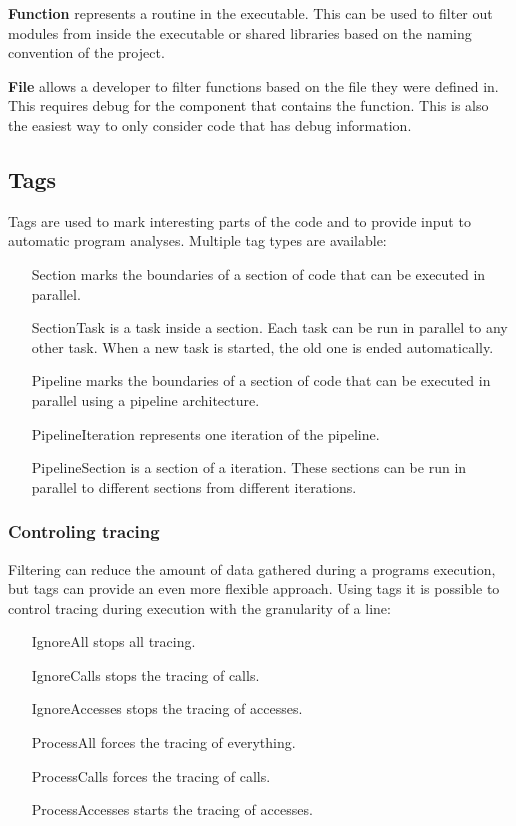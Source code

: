 \textbf{Function} represents a routine in the executable. This can be used to filter out modules from inside the executable or shared libraries based on the naming convention of the project.

\textbf{File} allows a developer to filter functions based on the file they were defined in. This requires debug for the component that contains the function. This is also the easiest way to only consider code that has debug information.

\subsection{Tags}

Tags are used to mark interesting parts of the code and to provide input to automatic program analyses. Multiple tag types are available:

\begin{itemize}
	\item [Section] marks the boundaries of a section of code that can be executed in parallel.
	\item [SectionTask] is a task inside a section. Each task can be run in parallel to any other task. When a new task is started, the old one is ended automatically.
	\item [Pipeline] marks the boundaries of a section of code that can be executed in parallel using a pipeline architecture.
	\item [PipelineIteration] represents one iteration of the pipeline.
	\item [PipelineSection] is a section of a iteration. These sections can be run in parallel to different sections from different iterations.
\end{itemize}

\subsubsection{Controling tracing}
Filtering can reduce the amount of data gathered during a programs execution, but tags can provide an even more flexible approach. Using tags it is possible to control tracing during execution with the granularity of a line:

\begin{itemize}
	\item [IgnoreAll] stops all tracing.
	\item [IgnoreCalls] stops the tracing of calls.
	\item [IgnoreAccesses] stops the tracing of accesses.
	\item [ProcessAll] forces the tracing of everything.
	\item [ProcessCalls] forces the tracing of calls.
	\item [ProcessAccesses] starts the tracing of accesses.
\end{itemize}

